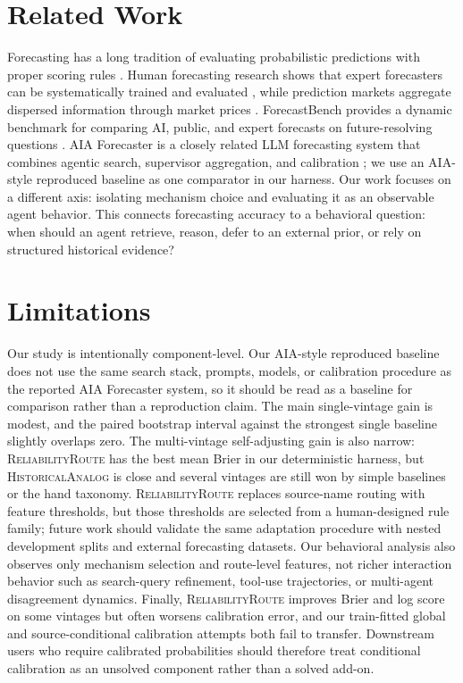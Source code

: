 \documentclass{article}
\newcommand{\rel}{\textsc{ReliabilityRoute}}
\newcommand{\hist}{\textsc{HistoricalAnalog}}
\begin{document}
\section{Related Work}

Forecasting has a long tradition of evaluating probabilistic predictions with proper scoring rules \citep{brier1950verification,gneiting2007strictly}. Human forecasting research shows that expert forecasters can be systematically trained and evaluated \citep{tetlock2015superforecasting}, while prediction markets aggregate dispersed information through market prices \citep{hanson2003combinatorial}. ForecastBench provides a dynamic benchmark for comparing AI, public, and expert forecasts on future-resolving questions \citep{karger2024forecastbench}. AIA Forecaster is a closely related LLM forecasting system that combines agentic search, supervisor aggregation, and calibration \citep{alur2025aia}; we use an AIA-style reproduced baseline as one comparator in our harness. Our work focuses on a different axis: isolating mechanism choice and evaluating it as an observable agent behavior. This connects forecasting accuracy to a behavioral question: when should an agent retrieve, reason, defer to an external prior, or rely on structured historical evidence?

\section{Limitations}

Our study is intentionally component-level. Our AIA-style reproduced baseline does not use the same search stack, prompts, models, or calibration procedure as the reported AIA Forecaster system, so it should be read as a baseline for comparison rather than a reproduction claim. The main single-vintage gain is modest, and the paired bootstrap interval against the strongest single baseline slightly overlaps zero. The multi-vintage self-adjusting gain is also narrow: \rel{} has the best mean Brier in our deterministic harness, but \hist{} is close and several vintages are still won by simple baselines or the hand taxonomy. \rel{} replaces source-name routing with feature thresholds, but those thresholds are selected from a human-designed rule family; future work should validate the same adaptation procedure with nested development splits and external forecasting datasets. Our behavioral analysis also observes only mechanism selection and route-level features, not richer interaction behavior such as search-query refinement, tool-use trajectories, or multi-agent disagreement dynamics. Finally, \rel{} improves Brier and log score on some vintages but often worsens calibration error, and our train-fitted global and source-conditional calibration attempts both fail to transfer. Downstream users who require calibrated probabilities should therefore treat conditional calibration as an unsolved component rather than a solved add-on.
\end{document}
